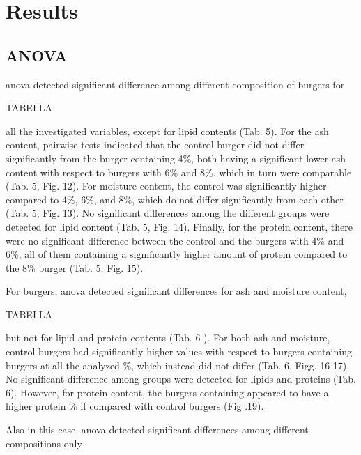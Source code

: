 
\section{Results}
\subsection{ANOVA}
\gls{anova} detected significant difference among different composition of  burgers for 

TABELLA

all the investigated variables, except for lipid contents (Tab. 5). For the ash content, pairwise tests indicated that the control burger did not differ significantly from the burger containing 4\%, both having a significant lower ash content with respect to burgers with 6\% and 8\%, which in turn were comparable (Tab. 5, Fig. 12).
For moisture content, the control was significantly higher compared to 4\%, 6\%, and 8\%, which do not differ significantly from each other (Tab. 5, Fig. 13). No significant differences among the different groups were detected for lipid content (Tab. 5, Fig. 14). Finally, for the protein content, there were no significant difference between the control and the burgers with 4\% and 6\%, all of them containing a significantly higher amount of protein compared to the 8\% burger (Tab. 5, Fig. 15).



For  burgers, \gls{anova} detected significant differences for ash and moisture content, 

TABELLA

but not for lipid and protein contents (Tab. 6 ). For both ash and moisture, control burgers had significantly higher values with respect to burgers containing  burgers at all the analyzed \%, which instead did not differ (Tab. 6, Figg. 16-17). No significant difference among groups were detected for lipids and proteins (Tab. 6). However, for protein content, the burgers containing  appeared to have a higher protein \% if compared with control burgers (Fig .19).



Also in this case, \gls{anova} detected significant differences among different compositions only

